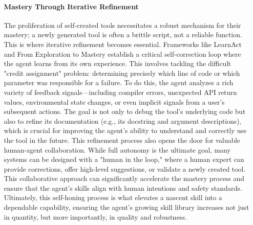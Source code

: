 \paragraph{Mastery Through Iterative Refinement}
The proliferation of self-created tools necessitates a robust mechanism for their mastery; a newly generated tool is often a brittle script, not a reliable function. This is where iterative refinement becomes essential. Frameworks like LearnAct and From Exploration to Mastery establish a critical self-correction loop where the agent learns from its own experience\citep{zhao2024learnact, fromexplorationtomastery}. This involves tackling the difficult "credit assignment" problem: determining precisely which line of code or which parameter was responsible for a failure. To do this, the agent analyzes a rich variety of feedback signals—including compiler errors, unexpected API return values, environmental state changes, or even implicit signals from a user's subsequent actions. The goal is not only to debug the tool's underlying code but also to refine its documentation (e.g., its docstring and argument descriptions), which is crucial for improving the agent's ability to understand and correctly use the tool in the future.
This refinement process also opens the door for valuable human-agent collaboration. While full autonomy is the ultimate goal, many systems can be designed with a "human in the loop," where a human expert can provide corrections, offer high-level suggestions, or validate a newly created tool. This collaborative approach can significantly accelerate the mastery process and ensure that the agent's skills align with human intentions and safety standards. Ultimately, this self-honing process is what elevates a nascent skill into a dependable capability, ensuring the agent's growing skill library increases not just in quantity, but more importantly, in quality and robustness.


